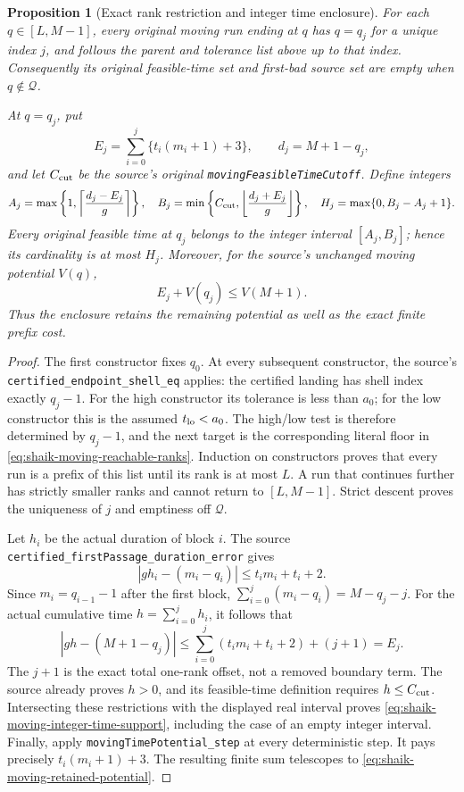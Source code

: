 \documentclass[11pt]{article}
\newtheorem{proposition}{Proposition}
\theoremstyle{remark}\newtheorem{remark}[proposition]{Remark}
\begin{document}
\begin{proposition}[Exact rank restriction and integer time enclosure]
\label{prop:shaik-moving-reachable-support}
For each \(q\in[L,M-1]\), every original moving run ending at \(q\)
has \(q=q_j\) for a unique index \(j\), and follows the parent
and tolerance list above up to that index.
Consequently its original feasible-time set and first-bad source
set are empty when \(q\notin\mathcal Q\).

At \(q=q_j\), put
\[
 E_j=\sum_{i=0}^j\{t_i(m_i+1)+3\},\qquad d_j=M+1-q_j,
\]
and let \(C_{\rm cut}\) be the source's original
\texttt{movingFeasibleTimeCutoff}. Define integers
\begin{equation}\label{eq:shaik-moving-integer-time-support}
 A_j=\max\left\{1,\left\lceil\frac{d_j-E_j}{g}\right\rceil\right\},
 \quad
 B_j=\min\left\{C_{\rm cut},
           \left\lfloor\frac{d_j+E_j}{g}\right\rfloor\right\},
 \quad H_j=\max\{0,B_j-A_j+1\}.
\end{equation}
Every original feasible time at \(q_j\) belongs to the integer
interval \([A_j,B_j]\); hence its cardinality is at most \(H_j\).
Moreover, for the source's unchanged moving potential \(V(q)\),
\begin{equation}\label{eq:shaik-moving-retained-potential}
 E_j+V(q_j)\le V(M+1).
\end{equation}
Thus the enclosure retains the remaining potential as well as
the exact finite prefix cost.
\end{proposition}
\begin{proof}
The first constructor fixes \(q_0\). At every subsequent constructor,
the source's \texttt{certified\_endpoint\_shell\_eq} applies:
the certified landing has shell index exactly \(q_j-1\).
For the high constructor its tolerance is less than \(a_0\);
for the low constructor this is the assumed \(t_{\rm lo}<a_0\).
The high/low test is therefore determined by \(q_j-1\), and the
next target is the corresponding literal floor in
\eqref{eq:shaik-moving-reachable-ranks}. Induction on constructors
proves that every run is a prefix of this list until its rank is
at most \(L\). A run that continues further has strictly smaller
ranks and cannot return to \([L,M-1]\). Strict descent proves the
uniqueness of \(j\) and emptiness off \(\mathcal Q\).

Let \(h_i\) be the actual duration of block \(i\).
The source \texttt{certified\_firstPassage\_duration\_error} gives
\[
 |g h_i-(m_i-q_i)|\le t_i m_i+t_i+2.
\]
Since \(m_i=q_{i-1}-1\) after the first block,
\(\sum_{i=0}^j(m_i-q_i)=M-q_j-j\).
For the actual cumulative time \(h=\sum_{i=0}^j h_i\), it follows that
\[
 |g h-(M+1-q_j)|
 \le \sum_{i=0}^j(t_i m_i+t_i+2)+(j+1)=E_j.
\]
The \(j+1\) is the exact total one-rank offset, not a removed
boundary term. The source already proves \(h>0\), and its
feasible-time definition requires \(h\le C_{\rm cut}\).
Intersecting these restrictions with the displayed real interval
proves \eqref{eq:shaik-moving-integer-time-support}, including
the case of an empty integer interval.
Finally, apply \texttt{movingTimePotential\_step} at every
deterministic step. It pays precisely \(t_i(m_i+1)+3\).
The resulting finite sum telescopes to
\eqref{eq:shaik-moving-retained-potential}.
\end{proof}
\end{document}
